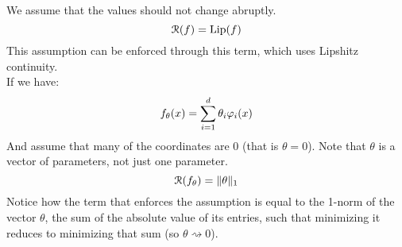 \documentclass[12pt]{article}
\begin{document}
We assume that the values should not change
abruptly. \\
\[ \mathcal{R}(f) = \text{Lip}(f) \]
This assumption can be enforced through this term,
which uses Lipshitz continuity. \\

If we have:
\[ f_\theta(x) 
= \sum_{i=1}^{d}\theta_i\varphi_i(x) \]
And assume that many of the coordinates
are $0$ (that is $\theta = 0$).
Note that $\theta$ is a vector of
parameters, not just one parameter.
\[ \mathcal{R}(f_\theta) = \|\theta\|_1 \]
Notice how the term that enforces the assumption
is equal to the 1-norm of the vector $\theta$,
the sum of the absolute value of its entries,
such that minimizing it reduces to minimizing
that sum (so $\theta \rightsquigarrow 0$). \\

\newpage
\end{document}
